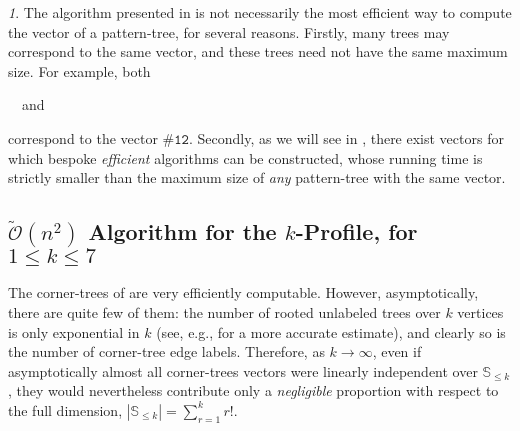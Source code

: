 \documentclass{article}
\newcommand{\pce}[1]{{\# \mathtt{#1} }}
\theoremstyle{remark}
\newtheorem{rem}[theorem]{\protect\remarkname}
\providecommand{\remarkname}{Remark}
\newcommand*\circled[1]{\tikz[baseline=(char.base)]{
            \node[shape=circle,draw,inner sep=0.7pt] (char) {#1};}}
\newcommand{\Otilde}[1]{\widetilde{\mathcal{O}}\left( #1 \right)}
\theoremstyle{plain}
\begin{document}
\begin{rem}
    The algorithm presented in  is not necessarily the most efficient way to compute the vector of a pattern-tree, for several reasons.
    Firstly, many trees may correspond to the same vector, and these trees need not have the same maximum size. For example, both \\
    \vspace{-0.3cm}
    \begin{center}
     \ \ and\ \  \circled{$\mathtt{12}$}
    \end{center}
    correspond to the vector $\pce{12}$.
    Secondly, as we will see in , there exist vectors for which bespoke \textit{efficient} algorithms can be constructed,
    whose running time is strictly smaller than the maximum size of \textit{any} pattern-tree with the same vector. 
\end{rem}

\subsection{\texorpdfstring{$\Otilde{n^2}$}{O(n\^2)} Algorithm for the \texorpdfstring{$k$}{k}-Profile, for \texorpdfstring{$1 \le k \le 7$}{1 <= k <= 7}}
\label{subsect:5_to_7_prof}

The corner-trees of \cite{even2021counting} are very efficiently computable.
However, asymptotically, there are quite few of them:
the number of rooted unlabeled trees over $k$ vertices is only exponential in $k$
(see, e.g., \cite{knuth1997art} for a more accurate estimate),
and clearly so is the number of corner-tree edge labels.
Therefore, as $k \to \infty$,
even if asymptotically almost all corner-trees vectors were linearly independent over $\mathbb{S}_{\le k}$, they would nevertheless contribute only a \textit{negligible} proportion with respect to the full dimension, $|\mathbb{S}_{\le k}| = \sum_{r=1}^k r!$.
\end{document}
